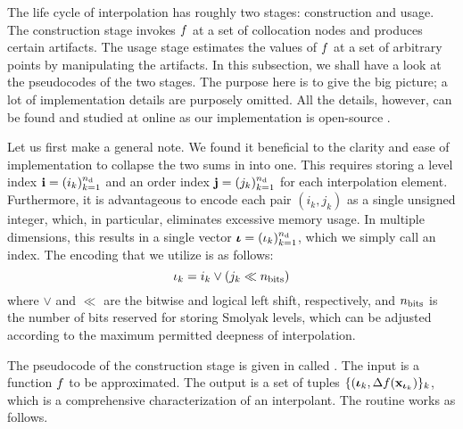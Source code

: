 The life cycle of interpolation has roughly two stages: construction and usage.
The construction stage invokes $f$ at a set of collocation nodes and produces
certain artifacts. The usage stage estimates the values of $f$ at a set of
arbitrary points by manipulating the artifacts. In this subsection, we shall
have a look at the pseudocodes of the two stages. The purpose here is to give
the big picture; a lot of implementation details are purposely omitted. All the
details, however, can be found and studied at online as our implementation is
open-source \cite{sources}.

Let us first make a general note. We found it beneficial to the clarity and ease
of implementation to collapse the two sums in  into one.
This requires storing a level index $\mathbf{i} = (i_k)_{k = 1}^{n_\text{d}}$ and an order
index $\mathbf{j} = (j_k)_{k = 1}^{n_\text{d}}$ for each interpolation element. Furthermore, it
is advantageous to encode each pair $(i_k, j_k)$ as a single unsigned integer,
which, in particular, eliminates excessive memory usage. In multiple dimensions,
this results in a single vector ${\bm{\iota}} = (\iota_k)_{k = 1}^{n_\text{d}}$, which we simply
call an index. The encoding that we utilize is as follows:
\[
  \iota_k = i_k \lor (j_k \ll n_\text{bits})
\]
where $\lor$ and $\ll$ are the bitwise  and logical left shift,
respectively, and $n_\text{bits}$ is the number of bits reserved for storing
Smolyak levels, which can be adjusted according to the maximum permitted
deepness of interpolation.


The pseudocode of the construction stage is given in  called
. The  input is a function $f$ to be
approximated. The  output is a set of tuples $\{ ({\bm{\iota}}_k,
\Delta f(\mathbf{x}_{{\bm{\iota}}_k}) \}_k$, which is a comprehensive characterization of an
interpolant. The routine works as follows.

